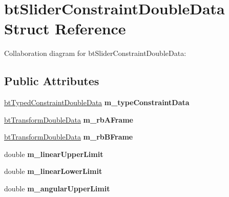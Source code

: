 \hypertarget{structbt_slider_constraint_double_data}{\section{bt\+Slider\+Constraint\+Double\+Data Struct Reference}
\label{structbt_slider_constraint_double_data}
}


Collaboration diagram for bt\+Slider\+Constraint\+Double\+Data\+:
\subsection*{Public Attributes}
\begin{DoxyCompactItemize}
\item 
\hypertarget{structbt_slider_constraint_double_data_a7e9b838f9968702fe8b609c5cd43ded7}{\hyperlink{structbt_typed_constraint_double_data}{bt\+Typed\+Constraint\+Double\+Data} {\bfseries m\+\_\+type\+Constraint\+Data}}\label{structbt_slider_constraint_double_data_a7e9b838f9968702fe8b609c5cd43ded7}

\item 
\hypertarget{structbt_slider_constraint_double_data_a4b4ad52c1358f819f48d387c6b32ffb7}{\hyperlink{structbt_transform_double_data}{bt\+Transform\+Double\+Data} {\bfseries m\+\_\+rb\+A\+Frame}}\label{structbt_slider_constraint_double_data_a4b4ad52c1358f819f48d387c6b32ffb7}

\item 
\hypertarget{structbt_slider_constraint_double_data_abe86dfd70a4bda339bc0d00dabf74ee3}{\hyperlink{structbt_transform_double_data}{bt\+Transform\+Double\+Data} {\bfseries m\+\_\+rb\+B\+Frame}}\label{structbt_slider_constraint_double_data_abe86dfd70a4bda339bc0d00dabf74ee3}

\item 
\hypertarget{structbt_slider_constraint_double_data_a1b6a8e5474e55ad1cc50b2f478b2c34b}{double {\bfseries m\+\_\+linear\+Upper\+Limit}}\label{structbt_slider_constraint_double_data_a1b6a8e5474e55ad1cc50b2f478b2c34b}

\item 
\hypertarget{structbt_slider_constraint_double_data_abe31d557d27a7de2c8fc7f25062c055f}{double {\bfseries m\+\_\+linear\+Lower\+Limit}}\label{structbt_slider_constraint_double_data_abe31d557d27a7de2c8fc7f25062c055f}

\item 
\hypertarget{structbt_slider_constraint_double_data_a801254f8d68b294e1e0071b83354089f}{double {\bfseries m\+\_\+angular\+Upper\+Limit}}\label{structbt_slider_constraint_double_data_a801254f8d68b294e1e0071b83354089f}


\end{DoxyCompactItemize}
